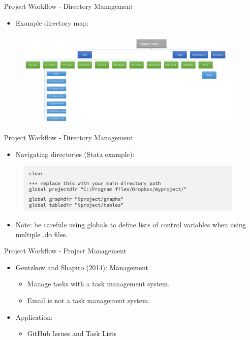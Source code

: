 \documentclass{beamer}
\begin{document}
\begin{frame}{Project Workflow - Directory Management}
    \begin{itemize}
        \item Example directory map:
    \end{itemize}
    \begin{figure}
        \includegraphics[scale=0.37]{directory_flow.png}
    \end{figure}    
\end{frame}

\begin{frame}{Project Workflow - Directory Management}
    \begin{itemize}
        \item Navigating directories (Stata example):
    \end{itemize}
    \begin{figure}
        \includegraphics[scale=0.5]{globals.png}
    \end{figure}  
        \bigskip
    \begin{itemize}
        \pause\item Note: be carefule using globals to define lists of control variables when using multiple .do files.
    \end{itemize}  
\end{frame}

\begin{frame}{Project Workflow - Project Management}
    \begin{itemize}
        \item Gentzkow and Shapiro (2014): Management
            \begin{itemize}
                \item Manage tasks with a task management system.
                \item Email is not a task management system.
        \end{itemize}
        \medskip
        \item Application:
            \begin{itemize}
                \item GitHub Issues and Task Lists
            \end{itemize}
    \end{itemize}
\end{frame}
\end{document}
